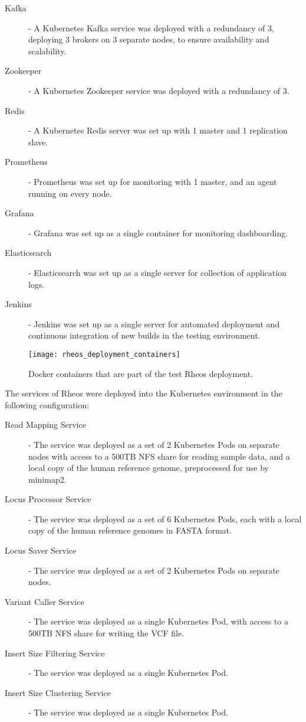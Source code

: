 \begin{description}
    \item [Kafka] - A Kubernetes Kafka service was deployed with a redundancy of 3, deploying 3 brokers on 3 separate nodes, to ensure availability and scalability.
    \item [Zookeeper] - A Kubernetes Zookeeper service was deployed with a redundancy of 3.
    \item [Redis] - A Kubernetes Redis server was set up with 1 master and 1 replication slave.
    \item [Prometheus] - Prometheus was set up for monitoring with 1 master, and an agent running on every node.
    \item [Grafana] - Grafana was set up as a single container for monitoring dashboarding.
    \item [Elasticsearch] - Elasticsearch was set up as a single server for collection of application logs.
    \item [Jenkins] - Jenkins was set up as a single server for automated deployment and continuous integration of new builds in the testing environment.
\end{description}

\begin{figure}[h!]
    \texttt{[image: rheos\_deployment\_containers]}
    \centering
    \caption {Docker containers that are part of the test Rheos deployment.}
    \label{fig:rheos_deployment_containers}
\end{figure}

The services of Rheos were deployed into the Kubernetes environment in the following configuration:

\begin{description}
    \item [Read Mapping Service] - The service was deployed as a set of 2 Kubernetes Pods on separate nodes with access to a 500TB NFS share for reading sample data, and a local copy of the human reference genome, preprocessed for use by minimap2.
    \item [Locus Processor Service] - The service was deployed as a set of 6 Kubernetes Pods, each with a local copy of the human reference genomes in FASTA format.
    \item [Locus Saver Service] - The service was deployed as a set of 2 Kubernetes Pods on separate nodes.
    \item [Variant Caller Service] - The service was deployed as a single Kubernetes Pod, with access to a 500TB NFS share for writing the VCF file.
    \item [Insert Size Filtering Service] - The service was deployed as a single Kubernetes Pod.
    \item [Insert Size Clustering Service] - The service was deployed as a single Kubernetes Pod.
\end{description}

